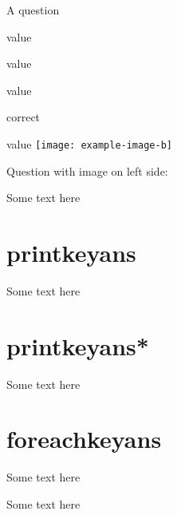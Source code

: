 \documentclass{article}
\begin{document}
\begin{enumext}[save-ans=mytest]
\begin{keyanspic}[label-pos=above, layout-sty={3,2}]
  \end{keyanspic}
\item A question
  \begin{keyans}[mini-env=0.5\linewidth, columns=1]
    \item value
    \item value
    \item value
    \item*[other note] correct
    \item value
    \miniright
    \texttt{[image: example-image-b]}
  \end{keyans}
\item Question with image on left side: 
\end{enumext}

Some text here
\section{printkeyans}
Some text here


\section{printkeyans*}
Some text here


\section{foreachkeyans}
Some text here


Some text here
\end{document}
